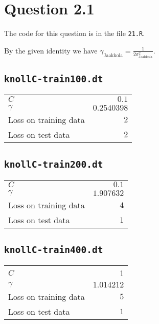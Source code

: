 \section*{Question 2.1}

The code for this question is in the file \texttt{21.R}.


By the given identity we have
$\gamma_{\text{Jaakkola}}=\frac{1}{2\sigma_{\text{Jaakkola}}^2}$.

\subsection*{\texttt{knollC-train100.dt}}
\begin{tabular}{|l|r|}
$C$ & $0.1$ \\
$\gamma$ & $0.2540398$ \\\hline
Loss on training data & $2$ \\
Loss on test data & $2$ \\\hline
\end{tabular}

\subsection*{\texttt{knollC-train200.dt}}
\begin{tabular}{|l|r|}
$C$ & $0.1$ \\
$\gamma$ & $1.907632$ \\\hline
Loss on training data & $4$ \\
Loss on test data & $1$ \\\hline
\end{tabular}

\subsection*{\texttt{knollC-train400.dt}}
\begin{tabular}{|l|r|}
$C$ & 1 \\
$\gamma$ & $1.014212$ \\\hline
Loss on training data & $5$ \\
Loss on test data & $1$ \\\hline
\end{tabular}
